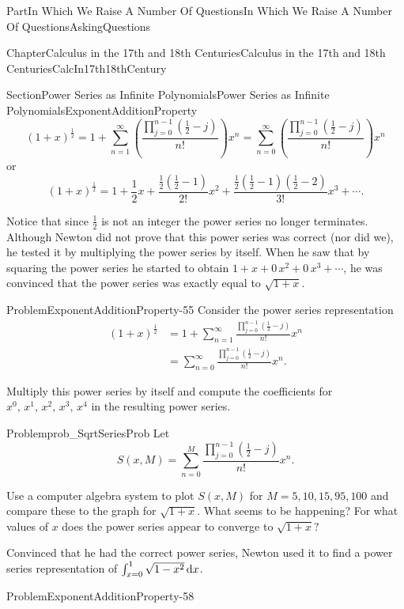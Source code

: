 \documentclass[oneside,10pt,]{book}
\numberwithin{equation}{part}
\newcommand{\dx}[1]{\,{\rm d}#1}
\newcommand{\amp}{&}
\begin{document}
\begin{partptx}{Part}{In Which We Raise A Number Of Questions}{}{In Which We Raise A Number Of Questions}{}{}{AskingQuestions}
\begin{chapterptx}{Chapter}{Calculus in the 17th and 18th Centuries}{}{Calculus in the 17th and 18th Centuries}{}{}{CalcIn17th18thCentury}
\begin{sectionptx}{Section}{Power Series as Infinite Polynomials}{}{Power Series as Infinite Polynomials}{}{}{ExponentAdditionProperty}
\begin{equation*}
\left(1+x\right)^{\frac{1}{2}}=1+\sum_{n=1}^\infty\left(\frac{ \prod_{j=0}^{n-1}\left(\frac{1}{2}-j\right)}{n!}\right)x^n=\sum_{n=0}^\infty\left(\frac{ \prod_{j=0}^{n-1}\left(\frac{1}{2}-j\right)}{n!}\right)x^n
\end{equation*}
or%
\begin{equation}
\left(1+x\right)^{\frac{1}{2}}=1+\frac{1}{2}x+\frac{\frac{1}{2}\left(\frac{1}{2}-1\right)}{2!}x^2+\frac{\frac{1}{2}\left(\frac{1}{2}-1\right)\left(\frac{1}{2}-2\right)}{3!}x^3+\cdots\text{.}\label{eq_BinomialSeries}
\end{equation}
%
\par
Notice that since \(\frac{1}{2}\) is not an integer the power series no longer terminates.  Although Newton did not prove that this power series was correct (nor did we), he tested it by multiplying the power series by itself.  When he saw that by squaring the power series he started to obtain \(1+x+0\,x^2+0\,x^3+\cdots\), he was convinced that the power series was exactly equal to \(\sqrt{1+x}\).%
\begin{problem}{Problem}{}{ExponentAdditionProperty-55}%
Consider the power series representation%
\begin{align*}
\left(1+x\right)^{\frac{1}{2}}\amp =1+\sum_{n=1}^\infty\frac{\prod_{j=0}^{n-1}\left(\frac{1}{2}-j\right)}{n!}x^n\\
\amp  =\sum_{n=0}^\infty\frac{\prod_{j=0}^{n-1}\left(\frac{1}{2}-j\right)}{n!}x^n\text{.}
\end{align*}
%
\par
Multiply this power series by itself and compute the coefficients for \(x^0,\,x^1,\,x^2,\,x^3,\,x^4\) in the resulting power series.%
\end{problem}
\begin{problem}{Problem}{}{prob_SqrtSeriesProb}%
Let%
\begin{equation*}
S(x,M)=\sum_{n=0}^M\frac{\prod_{j=0}^{n-1}\left(\frac{1}{2}-j \right)}{n!}x^n\text{.}
\end{equation*}
%
\par
Use a computer algebra system to plot \(S(x,M)\) for \(M=5, 10, 15, 95, 100\) and compare these to the graph for \(\sqrt{1+x}\).  What seems to be happening?  For what values of \(x\) does the power series appear to converge to \(\sqrt{1+x}?\)%
\end{problem}
Convinced that he had the correct power series, Newton used it to find a power series representation of \(\int_{x=0}^1\sqrt{1-x^2}
\dx{ x}\).%
\begin{problem}{Problem}{}{ExponentAdditionProperty-58}%

\end{problem}
\end{sectionptx}
\end{chapterptx}
\end{partptx}
\end{document}
